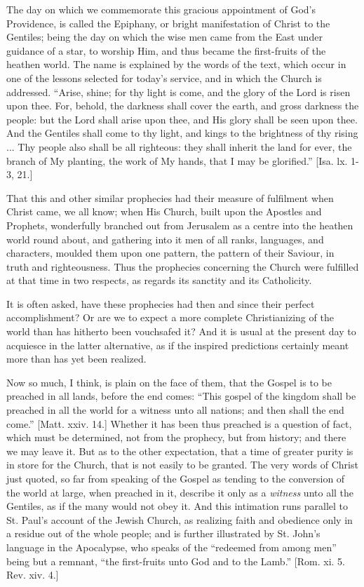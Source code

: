 The day on which we commemorate this gracious appointment of God's
Providence, is called the Epiphany, or bright manifestation of Christ
to the Gentiles; being the day on which the wise men came from the
East under guidance of a star, to worship Him, and thus became the
first-fruits of the heathen world. The name is explained by the words
of the text, which occur in one of the lessons selected for today's
service, and in which the Church is addressed. ``Arise, shine; for
thy light is come, and the glory of the Lord is risen upon thee. For,
behold, the darkness shall cover the earth, and gross darkness the
people: but the Lord shall arise upon thee, and His glory shall be
seen upon thee. And the Gentiles shall come to thy light, and kings to
the brightness of thy rising ... Thy people also shall be all
righteous: they shall inherit the land for ever, the branch of My
planting, the work of My hands, that I may be glorified.'' [Isa.
lx. 1-3, 21.]

That this and other similar prophecies had their measure of
fulfilment when Christ came, we all know; when His Church, built upon
the Apostles and Prophets, wonderfully branched out from Jerusalem as
a centre into the heathen world round about, and gathering into it men
of all ranks, languages, and characters, moulded them upon one
pattern, the pattern of their Saviour, in truth and righteousness.
Thus the prophecies concerning the Church were fulfilled at that time
in two respects, as regards its sanctity and its Catholicity.

It is often asked, have these prophecies had then and since their
perfect accomplishment? Or are we to expect a more complete
Christianizing of the world than has hitherto been vouchsafed it? And
it is usual at the present day to acquiesce in the latter alternative,
as if the inspired predictions certainly meant more than has yet been
realized.

Now so much, I think, is plain on the face of them, that the Gospel
is to be preached in all lands, before the end comes: ``This
gospel of the kingdom shall be preached in all the world for a witness
unto all nations; and then shall the end come.'' [Matt. xxiv. 14.]
Whether it has been thus preached is a question of fact, which must be
determined, not from the prophecy, but from history; and there we may
leave it. But as to the other expectation, that a time of greater
purity is in store for the Church, that is not easily to be granted.
The very words of Christ just quoted, so far from speaking of the
Gospel as tending to the conversion of the world at large, when
preached in it, describe it only as a \emph{witness} unto all the
Gentiles, as if the many would not obey it. And this intimation runs
parallel to St. Paul's account of the Jewish Church, as realizing
faith and obedience only in a residue out of the whole people; and is
further illustrated by St. John's language in the Apocalypse, who
speaks of the ``redeemed from among men'' being but a remnant,
``the first-fruits unto God and to the Lamb.'' [Rom. xi. 5.
Rev. xiv. 4.]

